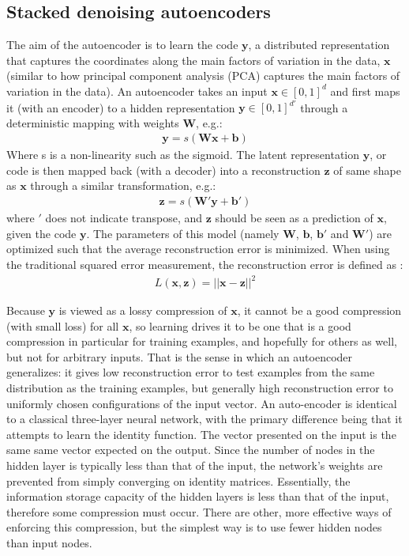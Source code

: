 \documentclass[12pt]{article}
\begin{document}
\begin{doublespacing}
	\subsection{Stacked denoising autoencoders}
The aim of the autoencoder is to learn the code $\mathbf y$, a distributed representation that captures the coordinates along the main factors of variation in the data, $\mathbf x$ (similar to how principal component analysis (PCA) captures the main factors of variation in the data). An autoencoder takes an input $\mathbf{x} \in [0,1]^d$ and first maps it (with an encoder) to a hidden representation $\mathbf{y} \in [0,1]^{d'}$ through a deterministic mapping with weights $\mathbf{W}$, e.g.:
\begin{align*}
\mathbf{y} = s(\mathbf{W}\mathbf{x} + \mathbf{b})
\end{align*}
Where s is a non-linearity such as the sigmoid. The latent representation $\mathbf{y}$, or code is then mapped back (with a decoder) into a reconstruction $\mathbf{z}$ of same shape as $\mathbf{x}$ through a similar transformation, e.g.:
\begin{align*}
\mathbf{z} = s(\mathbf{W'}\mathbf{y} + \mathbf{b'})
\end{align*}
where $\mathbf{\prime}$ does not indicate transpose, and $\mathbf{z}$ should be seen as a prediction of $\mathbf{x}$, given the code $\mathbf{y}$. The parameters of this model (namely $\mathbf{W}$, $\mathbf{b}$, $\mathbf{b'}$ and $\mathbf{W'}$) are optimized such that the average reconstruction error is minimized.  When using the traditional squared error measurement, the reconstruction error is defined as :
\begin{align*}
L(\mathbf{x}, \mathbf{z}) = || \mathbf{x} - \mathbf{z} ||^2
\end{align*}

Because $\mathbf y$ is viewed as a lossy compression of $\mathbf x$, it cannot be a good compression (with small loss) for all $\mathbf x$, so learning drives it to be one that is a good compression in particular for training examples, and hopefully for others as well, but not for arbitrary inputs. That is the sense in which an autoencoder generalizes: it gives low reconstruction error to test examples from the same distribution as the training examples, but generally high reconstruction error to uniformly chosen configurations of the input vector. An auto-encoder is identical to a classical three-layer neural network, with the primary difference being that it attempts to learn the identity function. The vector presented on the input is the same same vector expected on the output. Since the number of nodes in the hidden layer is typically less than that of the input, the network's weights are prevented from simply converging on identity matrices. Essentially, the information storage capacity of the hidden layers is less than that of the input, therefore some compression must occur. There are other, more effective ways of enforcing this compression, but the simplest way is to use fewer hidden nodes than input nodes.


\end{doublespacing}
\end{document}
